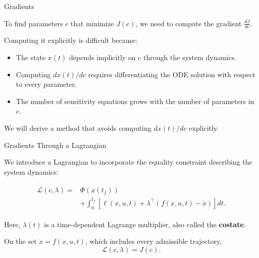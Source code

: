 \documentclass{beamer}
\begin{document}
\begin{frame}{Gradients}
	\begin{flushleft}
		To find parameters $c$ that minimize $J(c)$,
		we need to compute the gradient $\frac{dJ}{dc}$.
		
		\bigskip
		
		Computing it explicitly is difficult because:
		\begin{itemize}
			\item The state $x(t)$ depends implicitly on $c$
			through the system dynamics.
			\item Computing $dx(t)/dc$ requires differentiating
			the ODE solution with respect to every parameter.
			\item The number of sensitivity equations grows
			with the number of parameters in $c$.
		\end{itemize}
		
		\bigskip
		
		We will derive a method that avoids computing
		$dx(t)/dc$ explicitly.
	\end{flushleft}
\end{frame}

\begin{frame}{Gradients Through a Lagrangian}
	\begin{flushleft}
		We introduce a Lagrangian to incorporate the equality
		constraint describing the system dynamics:
		
		\begin{align}
			\boxed{
				\begin{aligned}
					\mathcal{L}(c,\lambda)
					={}&\Phi(x(t_f))\\
					&+\int_0^{t_f}
					\left[
					\ell(x,u,t)+
					\lambda^\top(f(x,u,t)-\dot{x})
					\right]dt.
				\end{aligned}
			}
		\end{align}
		
		Here, $\lambda(t)$ is a time-dependent Lagrange multiplier,
		also called the \textbf{costate}.
		
		\bigskip
		
		On the set $\dot{x}=f(x,u,t)$, which includes every
		admissible trajectory,
		\[
		\boxed{\mathcal{L}(c,\lambda)=J(c).}
		\]
	\end{flushleft}
\end{frame}
\end{document}
